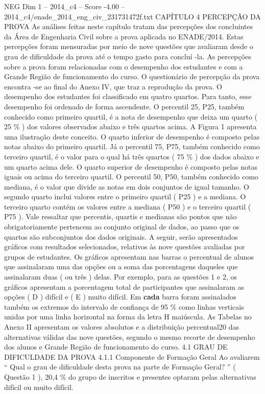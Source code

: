 \begin{textsample}{NEG Dim 1 – 2014\_c4 – Score -4.00 – 2014\_c4/enade\_2014\_eng\_civ\_231731472f.txt}  \label{ex:f1_neg_128}
CAPÍTULO 4 PERCEPÇÃO DA PROVA As análises feitas neste capítulo tratam das percepções dos concluintes da Área de Engenharia Civil sobre a prova aplicada no ENADE/2014.
Estas percepções foram mensuradas por meio de nove questões que avaliaram desde o grau de dificuldade da prova até o tempo gasto para concluí -la.
As percepções sobre a prova foram relacionadas com o desempenho dos estudantes e com a Grande Região de funcionamento do curso.
O questionário de percepção da prova encontra -se ao final do Anexo IV, que traz a reprodução da prova.
O desempenho dos estudantes foi classificado em quatro quartos.
Para tanto, esse desempenho foi ordenado de forma ascendente.
O percentil 25, P25, também conhecido como primeiro quartil, é a nota de desempenho que deixa um quarto ( 25 \% ) dos valores observados abaixo e três quartos acima.
A Figura 1 apresenta uma ilustração deste conceito.
O quarto inferior de desempenho é composto pelas notas abaixo do primeiro quartil.
Já o percentil 75, P75, também conhecido como terceiro quartil, é o valor para o qual há três quartos ( 75 \% ) dos dados abaixo e um quarto acima dele.
O quarto superior de desempenho é composto pelas notas iguais ou acima do terceiro quartil.
O percentil 50, P50, também conhecido como mediana, é o valor que divide as notas em dois conjuntos de igual tamanho.
O segundo quarto inclui valores entre o primeiro quartil ( P25 ) e a mediana.
O terceiro quarto contém os valores entre a mediana ( P50 ) e o terceiro quartil ( P75 ).
Vale ressaltar que percentis, quartis e medianas são pontos que não obrigatoriamente pertencem ao conjunto original de dados, ao passo que os quartos são subconjuntos dos dados originais.
A seguir, serão apresentados gráficos com resultados selecionados, relativos às nove questões avaliadas por grupos de estudantes.
Os gráficos apresentam nas barras o percentual de alunos que assinalaram uma das opções ou a soma das porcentagens daqueles que assinalaram duas ( ou três ) delas.
Por exemplo, para as questões 1 e 2, os gráficos apresentam a porcentagem total de participantes que assinalaram as opções ( D ) difícil e ( E ) muito difícil.
Em \textbf{cada} barra foram assinalados também os extremos do intervalo de confiança de 95 \% como linhas verticais unidas por uma linha horizontal na forma da letra H maiúscula.
As Tabelas no Anexo II apresentam os valores absolutos e a distribuição percentual20 das alternativas válidas das nove questões, segundo o mesmo recorte de desempenho dos alunos e Grande Região de funcionamento do curso. 4.1 GRAU DE DIFICULDADE DA PROVA 4.1.1 Componente de Formação Geral Ao avaliarem “ Qual o grau de dificuldade desta prova na parte de Formação Geral? ” ( Questão 1 ), 20,4 \% do grupo de inscritos e presentes optaram pelas alternativas difícil ou muito difícil.

\end{textsample}
